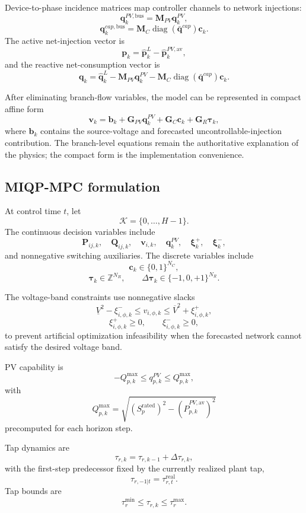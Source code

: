 Device-to-phase incidence matrices map controller channels to network injections:
\[
\mathbf q_{k}^{PV,\mathrm{bus}}
=
\mathbf M_{PV}\mathbf q_k^{PV},
\]
\[
\mathbf q_{k}^{cap,\mathrm{bus}}
=
\mathbf M_C
\operatorname{diag}(\bar{\mathbf q}^{cap})
\mathbf c_k.
\]
The active net-injection vector is
\[
\mathbf p_k
=
\hat{\mathbf p}_k^L
-
\hat{\mathbf p}_k^{PV,\mathrm{av}},
\]
and the reactive net-consumption vector is
\[
\mathbf q_k
=
\hat{\mathbf q}_k^L
-
\mathbf M_{PV}\mathbf q_k^{PV}
-
\mathbf M_C
\operatorname{diag}(\bar{\mathbf q}^{cap})
\mathbf c_k.
\]

After eliminating branch-flow variables, the model can be represented in compact affine
form
\[
\boxed{
\mathbf v_k
=
\mathbf b_k
+
\mathbf G_{PV}\mathbf q_k^{PV}
+
\mathbf G_C\mathbf c_k
+
\mathbf G_R\boldsymbol\tau_k,
}
\]
where $\mathbf b_k$ contains the source-voltage and forecasted uncontrollable-injection
contribution.  The branch-level equations remain the authoritative explanation of the
physics; the compact form is the implementation convenience.

\subsection{MIQP-MPC formulation}
\label{subsec:p1_mpc}

At control time $t$, let
\[
\mathcal K=\{0,\ldots,H-1\}.
\]
The continuous decision variables include
\[
\mathbf P_{ij,k},
\quad
\mathbf Q_{ij,k},
\quad
\mathbf v_{i,k},
\quad
\mathbf q_k^{PV},
\quad
\boldsymbol\xi_k^{+},
\quad
\boldsymbol\xi_k^{-},
\]
and nonnegative switching auxiliaries.  The discrete variables include
\[
\mathbf c_k\in\{0,1\}^{N_C},
\]
\[
\boldsymbol\tau_k\in\mathbb Z^{N_R},
\qquad
\Delta\boldsymbol\tau_k\in\{-1,0,+1\}^{N_R}.
\]

The voltage-band constraints use nonnegative slacks
\[
\underline V^2-\xi_{i,\phi,k}^{-}
\le
v_{i,\phi,k}
\le
\overline V^2+\xi_{i,\phi,k}^{+},
\]
\[
\xi_{i,\phi,k}^{+}\ge0,
\qquad
\xi_{i,\phi,k}^{-}\ge0,
\]
to prevent artificial optimization infeasibility when the forecasted network cannot
satisfy the desired voltage band.

PV capability is
\[
-Q_{p,k}^{\max}
\le
q_{p,k}^{PV}
\le
Q_{p,k}^{\max},
\]
with
\[
Q_{p,k}^{\max}
=
\sqrt{
(S_p^{\mathrm{rated}})^2
-
(\hat P_{p,k}^{PV,\mathrm{av}})^2
}
\]
precomputed for each horizon step.

Tap dynamics are
\[
\tau_{r,k}
=
\tau_{r,k-1}
+
\Delta\tau_{r,k},
\]
with the first-step predecessor fixed by the currently realized plant tap,
\[
\tau_{r,-1|t}
=
\tau_{r,t}^{\mathrm{real}}.
\]
Tap bounds are
\[
\tau_r^{\min}
\le
\tau_{r,k}
\le
\tau_r^{\max}.
\]

